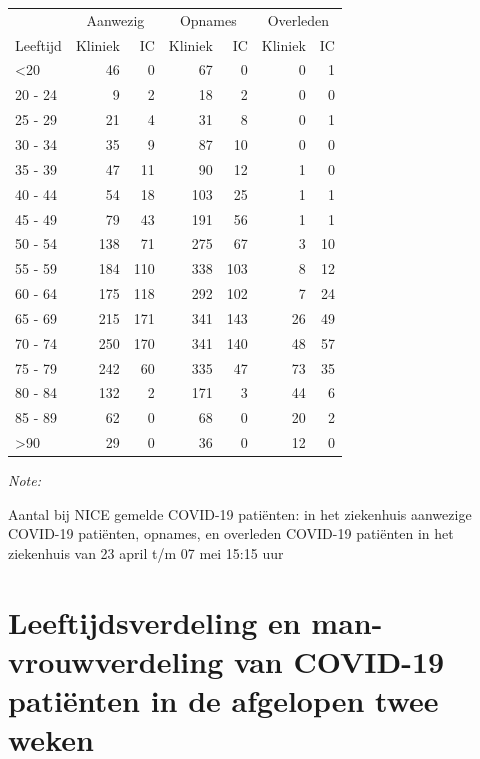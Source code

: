 \documentclass[
  english,
  man,floatsintext]{apa6}
\begin{document}
\begin{table}
\centering\begingroup\fontsize{10}{12}\selectfont

\begin{threeparttable}
\begin{tabular}{lrrrrrr}
\toprule
\multicolumn{1}{c}{ } & \multicolumn{2}{c}{Aanwezig} & \multicolumn{2}{c}{Opnames} & \multicolumn{2}{c}{Overleden} \\
\cmidrule(l{3pt}r{3pt}){2-3} \cmidrule(l{3pt}r{3pt}){4-5} \cmidrule(l{3pt}r{3pt}){6-7}
Leeftijd & Kliniek & IC & Kliniek & IC & Kliniek & IC\\
\midrule
<20 & 46 & 0 & 67 & 0 & 0 & 1\\
20 - 24 & 9 & 2 & 18 & 2 & 0 & 0\\
25 - 29 & 21 & 4 & 31 & 8 & 0 & 1\\
30 - 34 & 35 & 9 & 87 & 10 & 0 & 0\\
35 - 39 & 47 & 11 & 90 & 12 & 1 & 0\\
40 - 44 & 54 & 18 & 103 & 25 & 1 & 1\\
45 - 49 & 79 & 43 & 191 & 56 & 1 & 1\\
50 - 54 & 138 & 71 & 275 & 67 & 3 & 10\\
55 - 59 & 184 & 110 & 338 & 103 & 8 & 12\\
60 - 64 & 175 & 118 & 292 & 102 & 7 & 24\\
65 - 69 & 215 & 171 & 341 & 143 & 26 & 49\\
70 - 74 & 250 & 170 & 341 & 140 & 48 & 57\\
75 - 79 & 242 & 60 & 335 & 47 & 73 & 35\\
80 - 84 & 132 & 2 & 171 & 3 & 44 & 6\\
85 - 89 & 62 & 0 & 68 & 0 & 20 & 2\\
>90 & 29 & 0 & 36 & 0 & 12 & 0\\
\bottomrule
\end{tabular}
\begin{tablenotes}
\item \textit{Note: } 
\item Aantal bij NICE gemelde COVID-19 patiënten: in het ziekenhuis aanwezige COVID-19 patiënten, opnames, en overleden COVID-19 patiënten in het ziekenhuis van 23 april t/m 07 mei 15:15 uur
\end{tablenotes}
\end{threeparttable}
\endgroup{}
\end{table}

\newpage

\hypertarget{leeftijdsverdeling-en-man-vrouwverdeling-van-covid-19-patiuxebnten-in-de-afgelopen-twee-weken}{%
\section{Leeftijdsverdeling en man-vrouwverdeling van COVID-19 patiënten in de afgelopen twee weken}\label{leeftijdsverdeling-en-man-vrouwverdeling-van-covid-19-patiuxebnten-in-de-afgelopen-twee-weken}}
\end{document}
